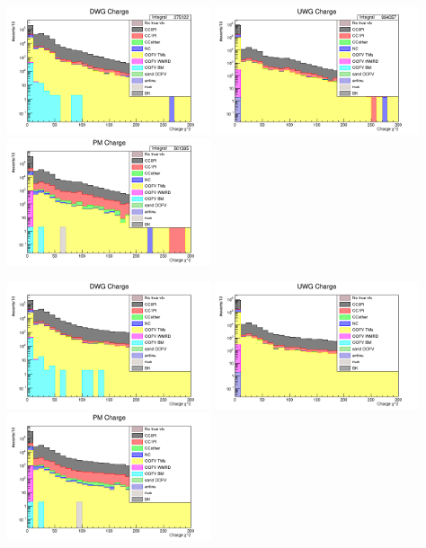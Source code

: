 \documentclass[%
 reprint,
 amsmath,amssymb,
 aps,
]{revtex4-2}
\begin{document}
    \includegraphics[width=0.45\textwidth]{images/charge_neg_chi2_wgbm_topo_DWG_accum_level[][26]_data_mc.png}
    \includegraphics[width=0.45\textwidth]{images/charge_neg_chi2_wgbm_topo_UWG_accum_level[][16]_data_mc.png}
    \includegraphics[width=0.45\textwidth]{images/charge_neg_chi2_wgbm_topo_PM_accum_level[][06]_data_mc.png}

    \includegraphics[width=0.45\textwidth]{images/charge_pos_chi2_wgbm_topo_DWG_accum_level[][26]_data_mc.png}
    \includegraphics[width=0.45\textwidth]{images/charge_pos_chi2_wgbm_topo_UWG_accum_level[][16]_data_mc.png}
    \includegraphics[width=0.45\textwidth]{images/charge_pos_chi2_wgbm_topo_PM_accum_level[][06]_data_mc.png}
\end{document}
